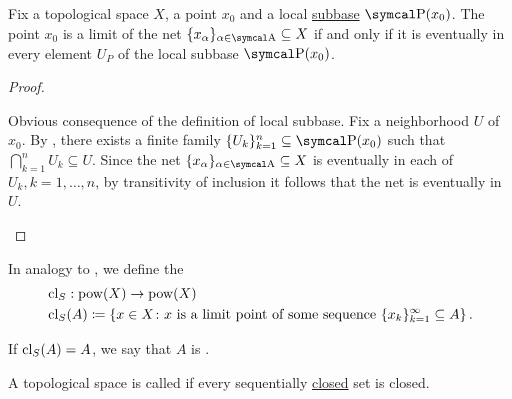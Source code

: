 \begin{proposition}\label{thm:net_convergence_via_subbases}
  Fix a topological space \( X \), a point \( x_0 \) and a local \hyperref[def:topological_local_subbase]{subbase} \( \CP(x_0) \). The point \( x_0 \) is a limit of the net \( \{ x_\al \}_{\al \in \CA} \subseteq X \) if and only if it is eventually in every element \( U_P \) of the local subbase \( \CP(x_0) \).
\end{proposition}
\begin{proof}\mbox{}
  \begin{description}
    \Implies Obvious consequence of the definition of local subbase.
    \ImpliedBy Fix a neighborhood \( U \) of \( x_0 \). By , there exists a finite family \( \{ U_k \}_{k=1}^n \subseteq \CP(x_0) \) such that \( \bigcap_{k=1}^n U_k \subseteq U \). Since the net \( \{ x_\al \}_{\al \in \CA} \subseteq X \) is eventually in each of \( U_k, k = 1, \ldots, n \), by transitivity of inclusion it follows that the net is eventually in \( U \).
  \end{description}
\end{proof}

\begin{definition}\label{def:sequential_closure_operator}
  In analogy to , we define the 
  \begin{align*}
    &\operatorname{cl}_S: \operatorname{pow}(X) \to \operatorname{pow}(X) \\
    &\operatorname{cl}_S(A) \coloneqq \left\{ x \in X \colon x \text{ is a limit point of some sequence } \{ x_k \}_{k=1}^\infty \subseteq A \right\}.
  \end{align*}

  If \( \operatorname{cl}_S(A) = A \), we say that \( A \) is .
\end{definition}

\begin{definition}\label{def:sequential_space}
  A topological space is called  if every sequentially \hyperref[def:sequential_closure_operator]{closed} set is closed.
\end{definition}

